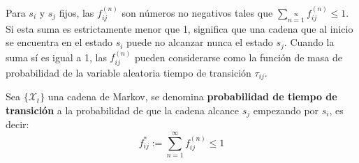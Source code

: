 Para $s_i$ y $s_j$ fijos, las $f_{ij}^{(n)}$ son números no negativos tales que $\sum\limits_{n=1}\limits^\infty f_{ij}^{(n)}\leq1$. Si esta suma es estrictamente menor que 1, significa que una cadena que al inicio se encuentra en el estado $s_i$ puede no alcanzar nunca el estado $s_j$. Cuando la suma sí es igual a 1, las $f_{ij}^{(n)}$ pueden considerarse como la función de masa de probabilidad de la variable aleatoria tiempo de transición $\tau_{ij}$.

\begin{definition}
    Sea $\{\mathcal{X}_t\}$ una cadena de Markov, se denomina \textbf{probabilidad de tiempo de transición} a la probabilidad de que la cadena alcance $s_j$ empezando por $s_i$, es decir:
    \[f_{ij}^*:=\sum_{n=1}^\infty f_{ij}^{(n)}\leq1\]
\end{definition}

